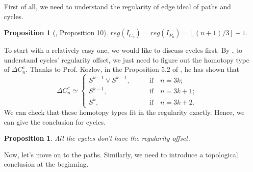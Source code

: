 \documentclass[dvipsnames,10pt]{article}
\newtheorem{proposition}[theorem]{Proposition}
\begin{document}
First of all, we need to understand the regularity of edge ideal of paths and cycles.

\begin{proposition}[\cite{woodroofe2014matchings}, Proposition 10]

$reg(I_{C_n})=reg(I_{P_n})=\left \lfloor(n+1)/3 \right \rfloor+1$.

\end{proposition}
To start with a relatively easy one, we would like to discuss cycles first. By , to understand cycles' regularity offset, we just need to figure out the homotopy type of $\Delta C_n^c$. Thanks to Prof. Kozlov, in the Proposition 5.2 of \cite{kozlov1999complexes}, he has shown that
\begin{equation*}
    \Delta C_n^c\simeq\left\{\begin{matrix}
 S^{k-1}\vee S^{k-1},\qquad &\text{if}\quad  n=3k;\\
 S^{k-1},\qquad &\text{if}\quad  n=3k+1;\\
 S^k,\qquad &\text{if}\quad  n=3k+2.
\end{matrix}\right.
\end{equation*}
We can check that these homotopy types fit in the regularity exactly. Hence, we can give the conclusion for cycles.

\begin{proposition}
    All the cycles don't have the regularity offset.
\end{proposition}
Now, let's move on to the paths. Similarly, we need to introduce a topological conclusion at the beginning.
\end{document}
